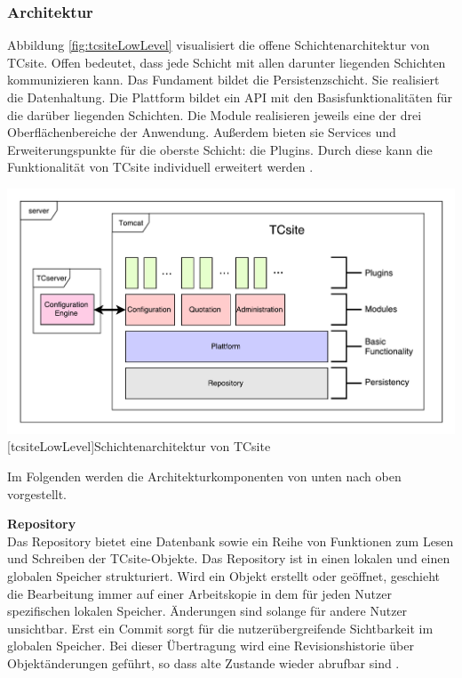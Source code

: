 \documentclass[12pt,a4paper,bibliography=totocnumbered,listof=totoc]{scrartcl}
\begin{document}
\subsubsection{Architektur}
\label{subsubsection:tcsiteArchitektur}

Abbildung \ref{fig:tcsiteLowLevel} visualisiert die offene Schichtenarchitektur von TCsite. Offen bedeutet, dass jede Schicht mit allen darunter liegenden Schichten kommunizieren kann. Das Fundament bildet die Persistenzschicht. Sie realisiert die Datenhaltung. Die Plattform bildet ein \ac{API} mit den Basisfunktionalitäten für die darüber liegenden Schichten. Die Module realisieren jeweils eine der drei Oberflächenbereiche der Anwendung. Außerdem bieten sie Services und Erweiterungspunkte für die oberste Schicht: die Plugins. Durch diese kann die Funktionalität von TCsite individuell erweitert werden \citep{tactonTCsiteDevelopmentManual}.

\vspace{1em}
\begin{minipage}{\linewidth}
	\centering
	\includegraphics[width=1\linewidth]{Abbildungen/tcsiteLowLevel.pdf}
	[tcsiteLowLevel]{Schichtenarchitektur von TCsite}
	\label{fig:tcsiteLowLevel}
\end{minipage}
\vspace{1em}

Im Folgenden werden die Architekturkomponenten von unten nach oben vorgestellt.

\textbf{Repository}\\
Das Repository bietet eine Datenbank sowie ein Reihe von Funktionen zum Lesen und Schreiben der TCsite-Objekte. Das Repository ist in einen lokalen und einen globalen Speicher strukturiert. Wird ein Objekt erstellt oder geöffnet, geschieht die Bearbeitung immer auf einer Arbeitskopie in dem für jeden Nutzer spezifischen lokalen Speicher. Änderungen sind solange für andere Nutzer unsichtbar. Erst ein Commit sorgt für die nutzerübergreifende Sichtbarkeit im globalen Speicher. Bei dieser Übertragung wird eine Revisionshistorie über Objektänderungen geführt, so dass alte Zustande wieder abrufbar sind \citep{tactonTCsiteDevelopmentManual}.
\end{document}
